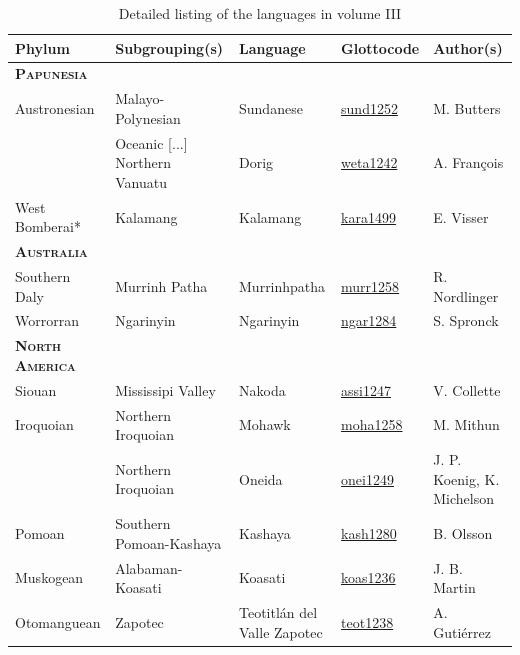 \documentclass[output=paper,colorlinks,citecolor=brown]{langscibook}
\begin{document}
    \begin{table}
        \centering\footnotesize
        \caption{Detailed listing of the languages in volume III}
        \label{tab:intro:list-of-languages03}
    \begin{tabularx}{\textwidth}{lllXl}
    \lsptoprule
        Phylum & Subgrouping(s) & Language & Glottocode & Author(s)\\
    \midrule
         \textsc{\textbf{Papunesia}} & & & &\\
          Austronesian & Malayo-Polynesian & Sundanese & \href{https://glottolog.org/resource/languoid/id/sund1252}{sund1252} & M. Butters\\
         & Oceanic [...] Northern Vanuatu & Dorig & \href{https://glottolog.org/resource/languoid/id/weta1242}{weta1242} & A. François\\
         West Bomberai* & Kalamang &  Kalamang & \href{https://glottolog.org/resource/languoid/id/kara1499}{kara1499} & E. Visser\\
    \midrule
         \textsc{\textbf{Australia}} & & & &\\
          Southern Daly & Murrinh Patha & Murrinhpatha & \href{https://glottolog.org/resource/languoid/id/murr1258}{murr1258} & R. Nordlinger\\
         Worrorran & Ngarinyin & Ngarinyin & \href{https://glottolog.org/resource/languoid/id/ngar1284}{ngar1284} & S. Spronck\\
    \midrule 
         \textsc{\textbf{North America}} & & & &\\
         Siouan & Mississipi Valley & Nakoda & \href{https://glottolog.org/resource/languoid/id/assi1247}{assi1247} & V. Collette\\
         Iroquoian & Northern Iroquoian & Mohawk & \href{https://glottolog.org/resource/languoid/id/moha1258}{moha1258} & M. Mithun\\
         & Northern Iroquoian & Oneida & \href{https://glottolog.org/resource/languoid/id/onei1249}{onei1249} & J. P. Koenig, K. Michelson\\
         Pomoan & Southern Pomoan-Kashaya & Kashaya & \href{https://glottolog.org/resource/languoid/id/kash1280}{kash1280} & B. Olsson\\
         Muskogean & Alabaman-Koasati & Koasati & \href{https://glottolog.org/resource/languoid/id/koas1236}{koas1236} & J. B. Martin\\
         Otomanguean & Zapotec & Teotitlán del Valle Zapotec & \href{https://glottolog.org/resource/languoid/id/teot1238}{teot1238} & A. Gutiérrez\\

\end{tabularx}
\end{table}
\end{document}
